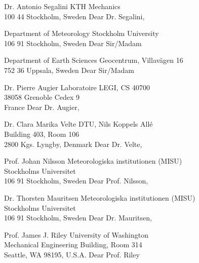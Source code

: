 %
%
%
%

Dr. Antonio Segalini
KTH Mechanics\\100 44 Stockholm, Sweden
Dear Dr. Segalini,

%

%

Department of Meteorology
Stockholm University\\106 91 Stockholm, Sweden
Dear Sir/Madam

Department of Earth Sciences
Geocentrum, Villavägen 16\\752 36 Uppsala, Sweden
Dear Sir/Madam

%

Dr. Pierre Augier
Laboratoire LEGI, CS 40700\\38058 Grenoble Cedex 9\\France
Dear Dr. Augier,

%

%

Dr. Clara Marika Velte
DTU, Nils Koppels Allé\\Building 403, Room 106\\2800 Kgs. Lyngby, Denmark
Dear Dr. Velte,

Prof. Johan Nilsson
Meteorologiska institutionen (MISU)\\Stockholms Universitet\\106 91 Stockholm, Sweden
Dear Prof. Nilsson,

Dr. Thorsten Mauritsen
Meteorologiska institutionen (MISU)\\Stockholms Universitet\\106 91 Stockholm, Sweden
Dear Dr. Mauritsen,

Prof. James J. Riley
University of Washington\\Mechanical Engineering Building, Room 314\\Seattle, WA 98195, U.S.A.
Dear Prof. Riley



